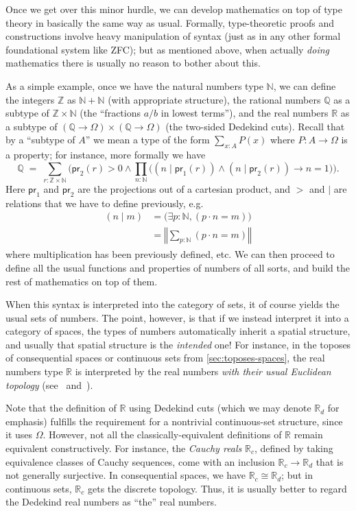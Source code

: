 \documentclass[12pt]{article}
\def\N{\mathbb{N}}
\def\Z{\mathbb{Z}}
\def\Q{\mathbb{Q}}
\def\R{\mathbb{R}}
\def\proj#1{\mathsf{pr}_{#1}}
\numberwithin{equation}{section}
\newcommand{\trunc}[2]{\mathopen{}\left\Vert #2\right\Vert_{#1}\mathclose{}}
\newcommand{\brck}[1]{\trunc{}{#1}}
\begin{document}
Once we get over this minor hurdle, we can develop mathematics on top of type theory in basically the same way as usual.
Formally, type-theoretic proofs and constructions involve heavy manipulation of syntax (just as in any other formal foundational system like ZFC); but as mentioned above, when actually \emph{doing} mathematics there is usually no reason to bother about this.

As a simple example, once we have the natural numbers type $\N$, we can define the integers $\Z$ as $\N+\N$ (with appropriate structure), the rational numbers $\Q$ as a subtype of $\Z\times \N$ (the ``fractions $a/b$ in lowest terms''), and the real numbers $\R$ as a subtype of $(\Q\to\Omega)\times (\Q\to\Omega)$ (the two-sided Dedekind cuts).
Recall that by a ``subtype of $A$'' we mean a type of the form $\sum_{x:A} P(x)$ where $P:A\to\Omega$ is a property; for instance, more formally we have
\[ \Q \;=\; \textstyle\sum_{r:\Z\times \N} \Big(\proj2(r)>0 \land \prod_{n:\N} \big((n\mid \proj1(r)) \land (n\mid\proj2(r)) \to n=1\big)\Big). \]
Here $\proj1$ and $\proj2$ are the projections out of a cartesian product, and $>$ and $\mid$ are relations that we have to define previously, e.g.
\begin{align*}
  (n\mid m) &=  \big(\exists p:\N, (p \cdot n = m)\big) \\
  &= \brck{\textstyle\sum_{p:\N} (p \cdot n = m)}
\end{align*}
where multiplication has been previously defined, etc.
We can then proceed to define all the usual functions and properties of numbers of all sorts, and build the rest of mathematics on top of them.

When this syntax is interpreted into the category of sets, it of course yields the usual sets of numbers.
The point, however, is that if we instead interpret it into a category of spaces, the types of numbers automatically inherit a spatial structure, and usually that spatial structure is the \emph{intended} one!
For instance, in the toposes of consequential spaces or continuous sets from \cref{sec:toposes-spaces}, the real numbers type $\R$ is interpreted by the real numbers \emph{with their usual Euclidean topology} (see~\cite[Proposition 4.4]{ptj:topological-topos} and~\cite[Theorem VI.9.2]{mm:shv-gl}).

Note that the definition of $\R$ using Dedekind cuts (which we may denote $\R_d$ for emphasis) fulfills the requirement for a nontrivial continuous-set structure, since it uses $\Omega$.
However, not all the classically-equivalent definitions of $\R$ remain equivalent constructively.
For instance, the \emph{Cauchy reals} $\R_c$, defined by taking equivalence classes of Cauchy sequences, come with an inclusion $\R_c \to \R_d$ that is not generally surjective.
In consequential spaces, we have $\R_c \cong \R_d$; but in continuous sets, $\R_c$ gets the discrete topology.
Thus, it is usually better to regard the Dedekind real numbers as ``the'' real numbers. %
\end{document}
